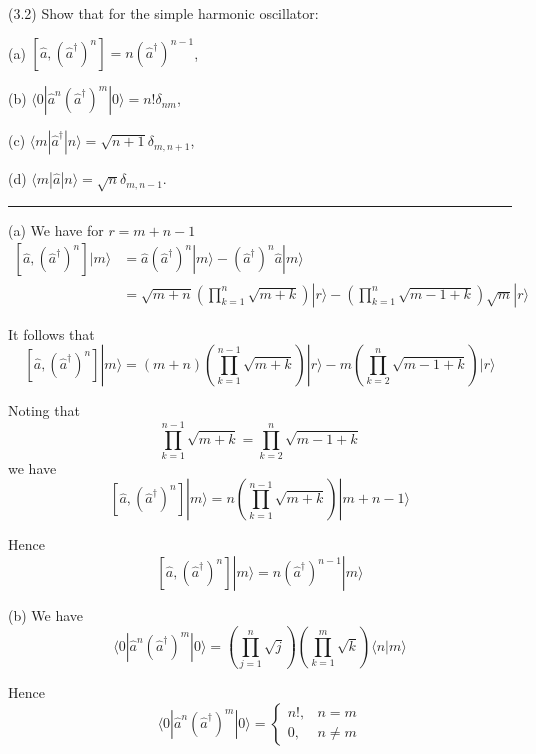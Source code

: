 \documentclass[12pt]{article}
\begin{document}
(3.2)
Show that for the simple harmonic oscillator:

\bigskip
(a) $\left[\hat a,(\hat a^\dag)^n\right]=n(\hat a^\dag)^{n-1}$,

(b) $\langle0|\hat a^n(\hat a^\dag)^m|0\rangle=n!\delta_{nm}$,

(c) $\langle m|\hat a^\dag|n\rangle=\sqrt{n+1}\delta_{m,n+1}$,

(d) $\langle m|\hat a|n\rangle=\sqrt{n}\delta_{m,n-1}$.

\bigskip
\hrule

\bigskip
(a) We have for $r=m+n-1$
\begin{align*}
\left[\hat a,(\hat a^\dag)^n\right]|m\rangle
&=\hat a(\hat a^\dag)^n|m\rangle-(\hat a^\dag)^n\hat a|m\rangle
\\
&=\sqrt{m+n}\left(\prod_{k=1}^n\sqrt{m+k}\right)|r\rangle
-\left(\prod_{k=1}^n\sqrt{m-1+k}\right)\sqrt{m}|r\rangle
\end{align*}

It follows that
\begin{equation*}
\left[\hat a,(\hat a^\dag)^n\right]|m\rangle
=(m+n)\left(\prod_{k=1}^{n-1}\sqrt{m+k}\right)|r\rangle
-m\left(\prod_{k=2}^n\sqrt{m-1+k}\right)|r\rangle
\end{equation*}

Noting that
\begin{equation*}
\prod_{k=1}^{n-1}\sqrt{m+k}=\prod_{k=2}^n\sqrt{m-1+k}
\end{equation*}
we have
\begin{equation*}
\left[\hat a,(\hat a^\dag)^n\right]|m\rangle
=n\left(\prod_{k=1}^{n-1}\sqrt{m+k}\right)|m+n-1\rangle
\end{equation*}

Hence
\begin{equation*}
\left[\hat a,(\hat a^\dag)^n\right]|m\rangle=n(\hat a^\dag)^{n-1}|m\rangle
\end{equation*}

(b) We have
\begin{equation*}
\langle0|\hat a^n(\hat a^\dag)^m|0\rangle
=\left(\prod_{j=1}^n\sqrt j\right)
\left(\prod_{k=1}^m\sqrt k\right)
\langle n|m\rangle
\end{equation*}

Hence
\begin{equation*}
\langle0|\hat a^n(\hat a^\dag)^m|0\rangle
=\begin{cases}
n!, & n=m
\\
0, & n\ne m
\end{cases}
\end{equation*}
\end{document}
